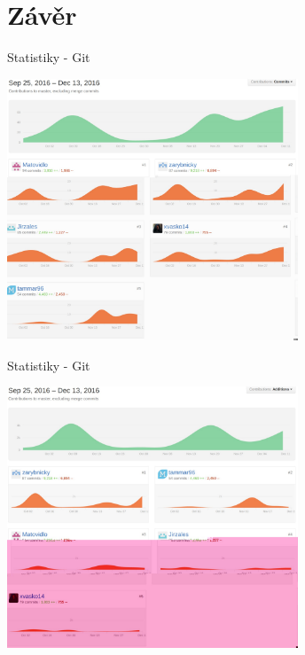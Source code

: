 \documentclass[13pt]{beamer}
\begin{document}
\section{Závěr}
\begin{frame}{Statistiky - Git}
  \begin{center}
    \includegraphics[width=0.65\textwidth]{./img/git_commit.pdf}
  \end{center}
\end{frame}

\begin{frame}{Statistiky - Git}
  \begin{center}
    \includegraphics[width=0.65\textwidth]{./img/git_additions.pdf}
  \end{center}
\end{frame}
\end{document}
